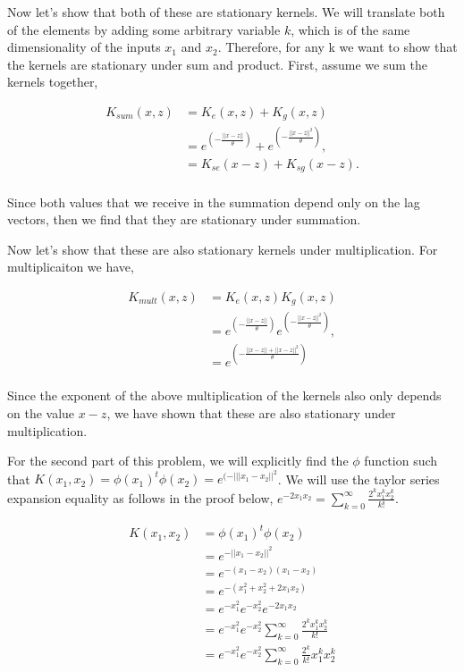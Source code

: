 \documentclass[paper=a4, fontsize=11pt]{scrartcl} %
\begin{document}
Now let's show that both of these are stationary kernels.  We will translate both of the elements by adding some arbitrary variable $k$, which is of the same dimensionality of the inputs $x_1$ and $x_2$.  Therefore, for any k we want to show that the kernels are stationary under sum and product.  First, assume we sum the kernels together,

\begin{align}
K_{sum}(x,z) &= K_e(x,z)+K_g(x,z) \\
&= e^{(-\frac{||x-z||}{\theta})} + e^{(-\frac{||x-z||^2}{\theta})}, \\
&= K_{se}(x-z) + K_{sg}(x-z). \\
\end{align}

Since both values that we receive in the summation depend only on the lag vectors, then we find that they are stationary under summation.

Now let's show that these are also stationary kernels under multiplication.  For multiplicaiton we have,

\begin{align}
K_{mult}(x,z) &= K_e(x,z)K_g(x,z) \\
&= e^{(-\frac{||x-z||}{\theta})}e^{(-\frac{||x-z||^2}{\theta})}, \\
&=  e^{(-\frac{||x-z||+||x-z||^2}{\theta})}\\
\end{align}

Since the exponent of the above multiplication of the kernels also only depends on the value $x-z$, we have shown that these are also stationary under multiplication.

For the second part of this problem, we will explicitly find the $\phi$ function such that $K(x_1,x_2) = \phi(x_1)^t\phi(x_2) =  e^{(-|||x_1-x_2||^2}$.  We will use the taylor series expansion equality as follows in the proof below, $e^{-2x_1x_2} = \sum \limits_{k=0}^\infty \frac{2^kx_1^kx_2^k}{k!}$. 

\begin{align}
K(x_1,x_2) &= \phi(x_1)^t\phi(x_2) \\
&= e^{-||x_1-x_2||^2} \\
&= e^{-(x_1-x_2)(x_1-x_2)}\\
&= e^{-(x_1^{2} + x_2^{2} + 2x_1x_2)} \\
&= e^{-x_1^{2}}e^{-x_2^{2}}e^{-2x_1x_2} \\
&= e^{-x_1^{2}}e^{-x_2^{2}} \sum \limits_{k=0}^\infty \frac{2^kx_1^kx_2^k}{k!} \\
&= e^{-x_1^{2}}e^{-x_2^{2}}\sum \limits_{k=0}^\infty \frac{2^{k}}{k!}x_1^kx_2^k
\end{align}
\end{document}
